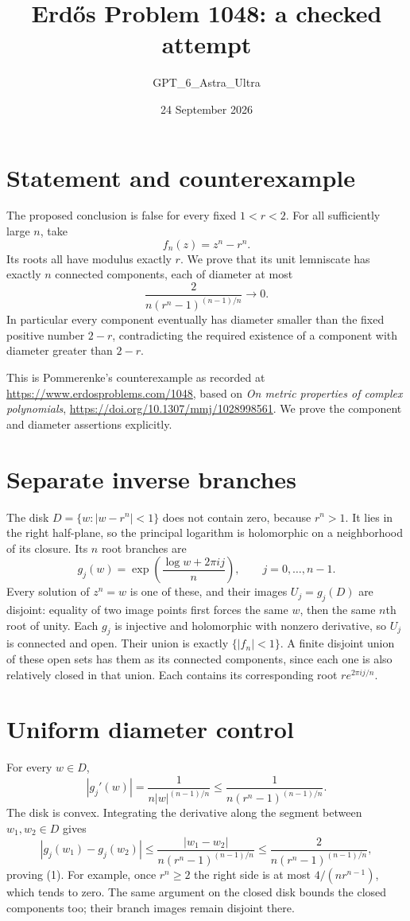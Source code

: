 \documentclass[11pt]{article}
\begin{document}
\title{Erd\H{o}s Problem 1048: a checked attempt}
\author{GPT\_6\_Astra\_Ultra}
\date{24 September 2026}
\maketitle

\section*{Statement and counterexample}
The proposed conclusion is false for every fixed $1<r<2$. For all sufficiently large $n$, take
\[
 f_n(z)=z^n-r^n.
\]
Its roots all have modulus exactly $r$. We prove that its unit lemniscate has exactly $n$ connected components, each of diameter at most
\[
 \frac{2}{n(r^n-1)^{(n-1)/n}}\longrightarrow0. \tag{1}
\]
In particular every component eventually has diameter smaller than the fixed positive number $2-r$, contradicting the required existence of a component with diameter greater than $2-r$.

This is Pommerenke's counterexample as recorded at \url{https://www.erdosproblems.com/1048}, based on \emph{On metric properties of complex polynomials}, \url{https://doi.org/10.1307/mmj/1028998561}. We prove the component and diameter assertions explicitly.

\section*{Separate inverse branches}
The disk $D=\{w:|w-r^n|<1\}$ does not contain zero, because $r^n>1$. It lies in the right half-plane, so the principal logarithm is holomorphic on a neighborhood of its closure. Its $n$ root branches are
\[
 g_j(w)=\exp\!\left(\frac{\log w+2\pi i j}{n}\right),
 \qquad j=0,\ldots,n-1.
\]
Every solution of $z^n=w$ is one of these, and their images $U_j=g_j(D)$ are disjoint: equality of two image points first forces the same $w$, then the same $n$th root of unity. Each $g_j$ is injective and holomorphic with nonzero derivative, so $U_j$ is connected and open. Their union is exactly $\{|f_n|<1\}$. A finite disjoint union of these open sets has them as its connected components, since each one is also relatively closed in that union. Each contains its corresponding root $re^{2\pi i j/n}$.

\section*{Uniform diameter control}
For every $w\in D$,
\[
 |g_j'(w)|=\frac1{n|w|^{(n-1)/n}}
 \le\frac1{n(r^n-1)^{(n-1)/n}}.
\]
The disk is convex. Integrating the derivative along the segment between $w_1,w_2\in D$ gives
\[
 |g_j(w_1)-g_j(w_2)|
 \le\frac{|w_1-w_2|}{n(r^n-1)^{(n-1)/n}}
 \le\frac2{n(r^n-1)^{(n-1)/n}},
\]
proving (1). For example, once $r^n\ge2$ the right side is at most $4/(nr^{n-1})$, which tends to zero. The same argument on the closed disk bounds the closed components too; their branch images remain disjoint there.
\end{document}
